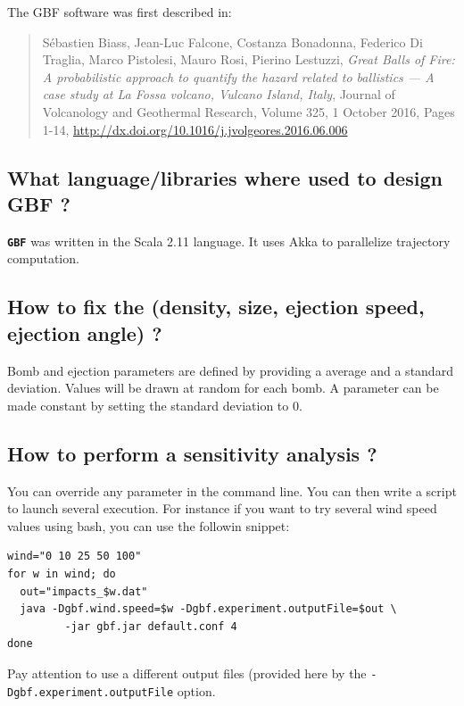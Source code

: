\documentclass[10pt,a4paper]{article}
\begin{document}
The GBF software was first described in:

\begin{quote}
Sébastien Biass, Jean-Luc Falcone, Costanza Bonadonna, Federico Di Traglia, Marco Pistolesi, Mauro Rosi, Pierino Lestuzzi, \emph{Great Balls of Fire: A probabilistic approach to quantify the hazard related to ballistics — A case study at La Fossa volcano, Vulcano Island, Italy}, Journal of Volcanology and Geothermal Research, Volume 325, 1 October 2016, Pages 1-14, \url{http://dx.doi.org/10.1016/j.jvolgeores.2016.06.006}
\end{quote}



\subsection{What language/libraries where used to design GBF ?}
\label{sec-6-2}

\textbf{\texttt{\textsf{\color{namecolor}GBF}}} was written in the Scala 2.11 language. It uses Akka to
parallelize trajectory computation.

\subsection{How to fix the (density, size, ejection speed, ejection angle) ?}
\label{sec-6-3}

Bomb and ejection parameters are defined by providing a average and a
standard deviation. Values will be drawn at random for each bomb. A parameter
can be made constant by setting the standard deviation to 0.

\subsection{How to perform a sensitivity analysis ?}
\label{sec-6-4}

You can override any parameter in the command line. You can then write
a script to launch several execution. For instance if you want to try
several wind speed values using bash, you can use the followin snippet:

\begin{verbatim}
wind="0 10 25 50 100"
for w in wind; do
  out="impacts_$w.dat"
  java -Dgbf.wind.speed=$w -Dgbf.experiment.outputFile=$out \
         -jar gbf.jar default.conf 4
done
\end{verbatim}

Pay attention to use a different output files (provided here by the
\texttt{-Dgbf.experiment.outputFile} option.
\end{document}
